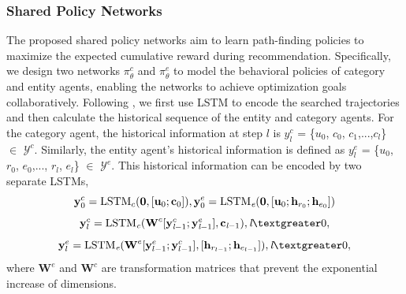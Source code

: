 \documentclass[conference]{IEEEtran}
\begin{document}

\subsubsection{Shared Policy Networks}
The proposed shared policy networks aim to learn path-finding policies to maximize the expected cumulative reward during recommendation. Specifically, we design two networks $\pi_{\theta}^c$ and $\pi_{\theta}^e$ to model the behavioral policies of category and entity agents, enabling the networks to achieve optimization goals collaboratively. %
Following \cite{EX7}, we first use LSTM to encode the searched trajectories and then calculate the historical sequence of the entity and category  agents. For the category agent, the historical information at step $l$ is $y^c_l$ = \{$u_0$, $c_0$, $c_1$,...,$c_l$\} $\in$ $ \mathcal{Y}^c$. Similarly, the entity agent's historical information is defined as $y^e_l$ = \{$u_0$, $r_0$, $e_0$,..., $r_l$, $e_l$\} $\in$ $ \mathcal{Y}^e$. This historical information can be encoded by two separate LSTMs, %
\begin{equation}
	\textbf{y}_{0}^{c} =  \mathrm{LSTM}_{c}(\textbf{0},[\textbf{u}_0; \textbf{c}_0]), \textbf{y}_{0}^{e} = \mathrm{LSTM}_{\emph{e}}(\textbf{0},[\textbf{u}_0; \textbf{h}_{r_0}; \textbf{h}_{e_0}])
\end{equation}
\begin{equation}
	\textbf{y}_{l}^{c} = \mathrm{LSTM}_{\emph{c}}(\textbf{W}^c[\textbf{y}_{\emph{l}-1}^c; \textbf{y}_{\emph{l}-1}^e],\textbf{c}_{\emph{l}-1}), \emph{l} \textgreater 0,
\end{equation}
\begin{equation}
	\textbf{y}_{l}^{e} = \mathrm{LSTM}_{\emph{e}}(\textbf{W}^e[\textbf{y}_{l-1}^e; \textbf{y}_{l-1}^c],[\textbf{h}_{r_{l-1}}; \textbf{h}_{e_{l-1}}]), \emph{l} \textgreater 0,
\end{equation}
where $\textbf{W}^e$ and $\textbf{W}^c$ are transformation matrices that prevent the exponential increase of dimensions. %
\end{document}
